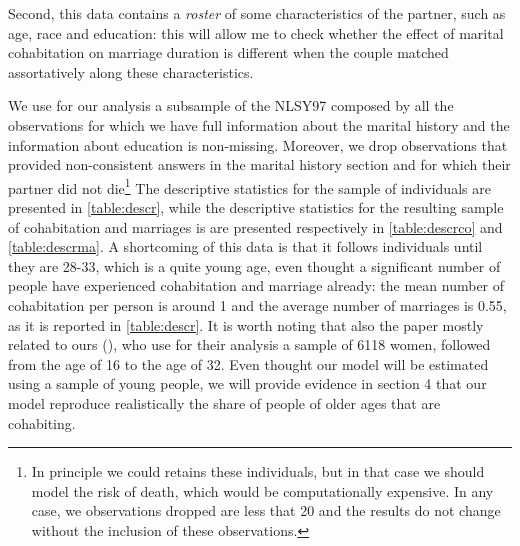 \documentclass[12pt]{article}
\begin{document}
 Second, this data contains a \textit{roster} of some characteristics of the partner, such as age, race and education: this will allow me to check whether the effect of marital cohabitation on marriage duration is different when the couple matched assortatively along these characteristics.
 
   We use for our analysis a subsample of the NLSY97 composed by  all the observations for which we have full information about the marital history and the information about education is non-missing. Moreover, we drop observations that provided non-consistent answers in the marital history section and for which their partner did not die\footnote{In principle we could retains these individuals, but in that case we should model the risk of death, which would be computationally expensive. In any case, we observations dropped are less that 20 and the results do not change without the inclusion of these observations.} The descriptive statistics for the sample of individuals are presented in \autoref{table:descr}, while the descriptive statistics for the resulting sample of cohabitation and marriages is are presented respectively in \autoref{table:descrco} and \autoref{table:descrma}.  A shortcoming of this data is that it follows individuals until they are 28-33, which is a quite young age, even thought a significant number of people have experienced cohabitation and marriage already: the mean number of cohabitation per person is around 1 and the average number of marriages is 0.55, as it is reported in \autoref{table:descr}. It is worth noting that also the paper mostly related to ours (\citet{brien2006}), who use for their analysis a sample of 6118 women, followed from the age of 16 to the age of 32. Even thought our model will be estimated using a sample of young people, we will provide evidence in section 4 that our model reproduce realistically the share of people of older ages that are cohabiting.
 
\end{document}
